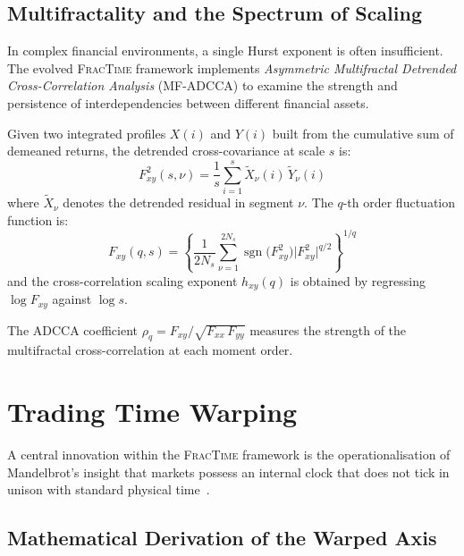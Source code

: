 \documentclass[12pt,a4paper]{article}
\begin{document}
\subsection{Multifractality and the Spectrum of Scaling}
\label{sec:mfdfa}

In complex financial environments, a single Hurst exponent is often
insufficient.  The evolved \textsc{FracTime} framework implements
\emph{Asymmetric Multifractal Detrended Cross-Correlation Analysis}
(MF-ADCCA) to examine the strength and persistence of interdependencies
between different financial assets.

Given two integrated profiles $X(i)$ and $Y(i)$ built from the cumulative
sum of demeaned returns, the detrended cross-covariance at scale $s$ is:
\begin{equation}
  F_{xy}^2(s,\nu) = \frac{1}{s}\sum_{i=1}^{s}
    \widetilde{X}_\nu(i)\,\widetilde{Y}_\nu(i)
  \label{eq:adcca_cov}
\end{equation}
where $\widetilde{X}_\nu$ denotes the detrended residual in segment $\nu$.
The $q$-th order fluctuation function is:
\begin{equation}
  F_{xy}(q,s) = \left\{
    \frac{1}{2N_s}\sum_{\nu=1}^{2N_s}
    \operatorname{sgn}\!\bigl(F_{xy}^2\bigr)
    \bigl|F_{xy}^2\bigr|^{q/2}
  \right\}^{1/q}
  \label{eq:adcca_fluct}
\end{equation}
and the cross-correlation scaling exponent $h_{xy}(q)$ is obtained by
regressing $\log F_{xy}$ against $\log s$.

The ADCCA coefficient $\rho_q = F_{xy} / \sqrt{F_{xx}\,F_{yy}}$
measures the strength of the multifractal cross-correlation at each
moment order.

\section{Trading Time Warping}
\label{sec:ttw}

A central innovation within the \textsc{FracTime} framework is the
operationalisation of Mandelbrot's insight that markets possess an internal
clock that does not tick in unison with standard physical
time~\citep{Mandelbrot1982}.

\subsection{Mathematical Derivation of the Warped Axis}
\end{document}
